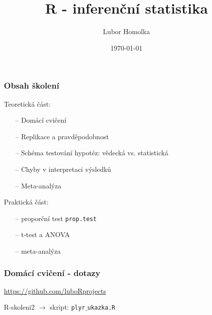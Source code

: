 \documentclass[10pt,xcolor={dvipsnames}]{beamer}
\begin{document}
\title{\textsf{R} - inferenční statistika}
\author{Lubor Homolka}
\date{\today}
\begin{frame}
\titlepage
\end{frame}


\begin{frame}
\frametitle{Obsah školení}
\begin{large}
Teoretická část:\\
\begin{itemize}
\item[--] Domácí cvičení  \\[0.3cm]
\item[--] Replikace a pravděpodobnost \\[0.3cm]
\item[--] Schéma testování hypotéz: vědecká vs. statistická \\[0.3cm]
\item[--] Chyby v interpretaci výsledků \\[0.3cm]
\item[--] Meta-analýza \\[0.5cm]
\end{itemize}
Praktická část:\\
\begin{itemize}
\item[--] proporční test \texttt{prop.test} \\[0.3cm]
\item[--] t-test a ANOVA \\[0.3cm]
\item[--] meta-analýza
\end{itemize}
\end{large}
\end{frame}

\begin{frame}
\frametitle{Domácí cvičení - dotazy}\begin{large}
\begin{center}
\url{https://github.com/luboRprojects}\newline\bigskip
	
\hspace*{-0.6cm}R-skoleni2 \hspace*{0.5cm}$\rightarrow$ \hspace*{0.5cm}skript: \texttt{plyr}$\_$\texttt{ukazka.R}
\end{center}
\end{large}
\end{frame}
\end{document}
